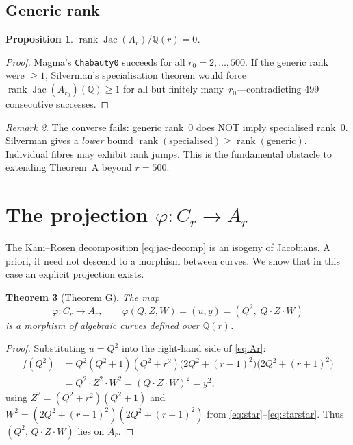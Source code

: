 \documentclass[11pt]{amsart}
\theoremstyle{plain}
\newtheorem{theorem}{Theorem}[section]
\newtheorem{proposition}[theorem]{Proposition}
\theoremstyle{definition}
\theoremstyle{remark}
\newtheorem{remark}[theorem]{Remark}
\newcommand{\QQ}{\mathbb{Q}}
\newcommand{\Jac}{\operatorname{Jac}}
\newcommand{\rank}{\operatorname{rank}}
\begin{document}
\subsection{Generic rank}

\begin{proposition}\label{prop:generic-rank}
$\rank\Jac(A_r)/\QQ(r)=0$.
\end{proposition}

\begin{proof}
Magma's \texttt{Chabauty0} succeeds for all $r_0=2,\dots,500$.
If the generic rank were $\ge 1$, Silverman's specialisation theorem
\cite{Silverman1983} would force $\rank\Jac(A_{r_0})(\QQ)\ge 1$ for all but finitely
many~$r_0$---contradicting 499 consecutive successes.
\end{proof}

\begin{remark}
The converse fails: generic rank~0 does NOT imply specialised rank~0.
Silverman gives a \emph{lower} bound $\rank(\text{specialised})\ge\rank(\text{generic})$.
Individual fibres may exhibit rank jumps.  This is the fundamental obstacle
to extending Theorem~A beyond $r=500$.
\end{remark}


\section{The projection $\varphi\colon C_r\to A_r$}\label{sec:phi}

The Kani--Rosen decomposition \eqref{eq:jac-decomp} is an isogeny of Jacobians.
A priori, it need not descend to a morphism between curves.
We show that in this case an explicit projection exists.

\begin{theorem}[Theorem G]\label{thm:G}
The map
\begin{equation}\label{eq:phi}
  \varphi\colon C_r\to A_r,\qquad
  \varphi(Q,Z,W)=(u,y)=(Q^2,\;Q\cdot Z\cdot W)
\end{equation}
is a morphism of algebraic curves defined over $\QQ(r)$.
\end{theorem}

\begin{proof}
Substituting $u=Q^2$ into the right-hand side of \eqref{eq:Ar}:
\begin{align*}
  f(Q^2) &= Q^2(Q^2+1)(Q^2+r^2)\bigl(2Q^2+(r{-}1)^2\bigr)\bigl(2Q^2+(r{+}1)^2\bigr)\\
         &= Q^2\cdot Z^2\cdot W^2 = (Q\cdot Z\cdot W)^2 = y^2,
\end{align*}
using $Z^2=(Q^2+r^2)(Q^2+1)$ and $W^2=(2Q^2+(r{-}1)^2)(2Q^2+(r{+}1)^2)$
from \eqref{eq:star}--\eqref{eq:starstar}.
Thus $(Q^2,\,Q\cdot Z\cdot W)$ lies on $A_r$.
\end{proof}
\end{document}

